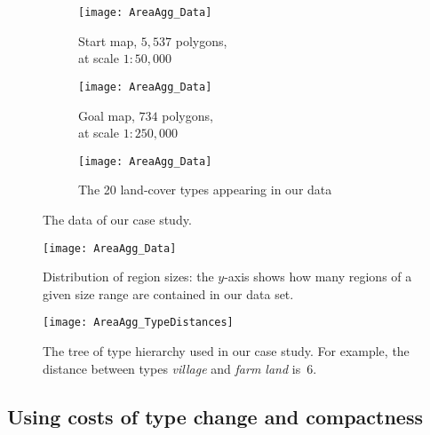 \documentclass[acmsmall,natbib=false]{acmart}
\begin{document}
\begin{figure}[tb]
\captionsetup[subfigure]{labelformat=empty}
\begin{subfigure}[b]{.49\textwidth}
	\centering
	\texttt{[image: AreaAgg\_Data]}
	\caption{Start map, $5{,}537$ polygons, \\
		at scale $1:50{,}000$}
\end{subfigure}
\hfill
\begin{subfigure}[b]{.49\textwidth}
	\centering
	\texttt{[image: AreaAgg\_Data]}
	\caption{Goal map, $734$ polygons, \\
		at scale $1:250{,}000$}
\end{subfigure}
%
\par\vspace{\baselineskip} %
%
\begin{subfigure}{\textwidth}
	\centering
	\texttt{[image: AreaAgg\_Data]}
	\caption{The 20 land-cover types appearing in our data}
\end{subfigure}
\caption{The data of our case study.}
\label{fig:AreaAgg_Data}
\end{figure}

\begin{figure}[tb]
\centering
\texttt{[image: AreaAgg\_Data]}
\caption{Distribution of region sizes:
	the $y$-axis shows how many regions 
	of a given size range are contained in our data set.}
\label{fig:AreaAgg_NumRegion}
\end{figure}

\begin{figure}[tb]
\centering
\texttt{[image: AreaAgg\_TypeDistances]}
\caption{The tree of type hierarchy used in our case study.
	For example, the distance between 
	types \emph{village} and \emph{farm land} is~$6$.}
\label{fig:AreaAgg_TypeDistances}
\end{figure}

\subsection{Using costs of type change and compactness}
\label{sec:AreaAgg_CaseStudy1}
\end{document}
